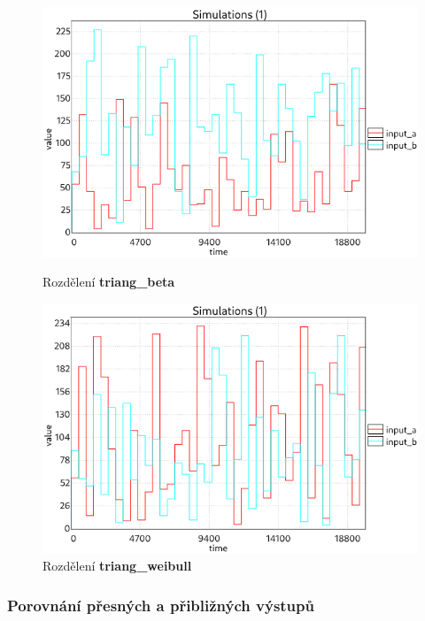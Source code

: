 \begin{figure}[H]
\centering
\begin{minipage}{.5\textwidth}
  \centering
  \includegraphics[width=0.95\linewidth]{obrazky-figures/inputs_triang_beta.png}
  \caption{Rozdělení \textbf{triang\_beta}}
  \label{fig:inputs_triang_beta}
\end{minipage}%
\begin{minipage}{.5\textwidth}
  \centering
  \includegraphics[width=0.95\linewidth]{obrazky-figures/inputs_triang_weibull.png}
  \caption{Rozdělení \textbf{triang\_weibull}}
  \label{fig:inputs_triang_weibull}
\end{minipage}
\end{figure}

\bigskip
\bigskip
\bigskip

\subsubsection{Porovnání přesných a přibližných výstupů}

